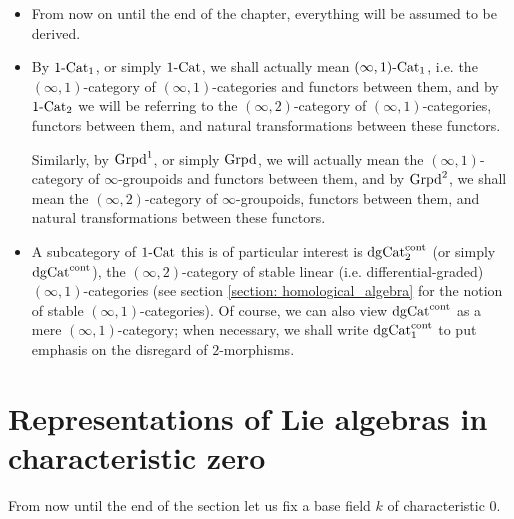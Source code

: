     \begin{convention} \label{conv: formal_geometry_everything_is_derived}
        \noindent
        \begin{itemize}
            \item From now on until the end of the chapter, everything will be assumed to be derived. 
            \item By $1\text{-}\mathrm{Cat}_1$, or simply $1\text{-}\mathrm{Cat}$, we shall actually mean $(\infty, 1)\text{-}\mathrm{Cat}_1$, i.e. the $(\infty, 1)$-category of $(\infty, 1)$-categories and functors between them, and by $1\text{-}\mathrm{Cat}_2$ we will be referring to the $(\infty, 2)$-category of $(\infty, 1)$-categories, functors between them, and natural transformations between these functors. 
            
            Similarly, by $\mathrm{Grpd}^1$, or simply $\mathrm{Grpd}$, we will actually mean the $(\infty, 1)$-category of $\infty$-groupoids and functors between them, and by $\mathrm{Grpd}^2$, we shall mean the $(\infty, 2)$-category of $\infty$-groupoids, functors between them, and natural transformations between these functors.
            \item A subcategory of $1\text{-}\mathrm{Cat}$ this is of particular interest is $\mathrm{dg}\mathrm{Cat}^{\mathrm{cont}}_2$ (or simply $\mathrm{dg}\mathrm{Cat}^{\mathrm{cont}}$), the $(\infty, 2)$-category of stable linear (i.e. differential-graded) $(\infty, 1)$-categories (see section \ref{section: homological_algebra} for the notion of stable $(\infty, 1)$-categories). Of course, we can also view $\mathrm{dg}\mathrm{Cat}^{\mathrm{cont}}$ as a mere $(\infty, 1)$-category; when necessary, we shall write $\mathrm{dg}\mathrm{Cat}^{\mathrm{cont}}_1$ to put emphasis on the disregard of $2$-morphisms.
        \end{itemize} 
    \end{convention}
    
    \section{Representations of Lie algebras in characteristic zero}
        \begin{convention}
            From now until the end of the section let us fix a base field $k$ of characteristic $0$.
        \end{convention}
    
